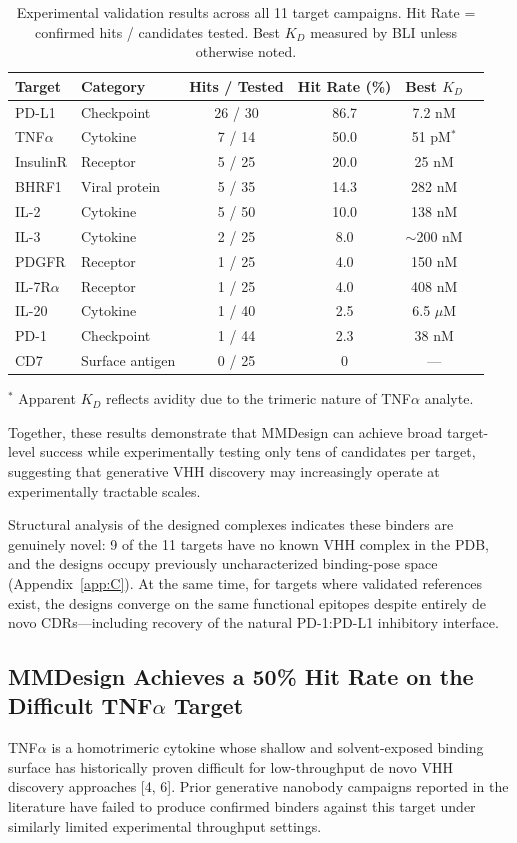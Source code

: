 \documentclass[11pt]{article}
\begin{document}
\begin{table}[!htbp]
\centering
\begin{tabular}{llcccc}
\toprule
Target & Category & Hits / Tested & Hit Rate (\%) & Best $K_D$\\
\midrule
PD-L1    & Checkpoint      & 26 / 30 & 86.7 & 7.2 nM\\
TNF$\alpha$  & Cytokine        & 7 / 14  & 50.0 & 51 pM$^{\ast}$\\
InsulinR & Receptor        & 5 / 25  & 20.0 & 25 nM\\
BHRF1    & Viral protein   & 5 / 35  & 14.3 & 282 nM\\
IL-2     & Cytokine        & 5 / 50  & 10.0 & 138 nM\\
IL-3     & Cytokine        & 2 / 25  & 8.0  & $\sim$200 nM\\
PDGFR    & Receptor        & 1 / 25  & 4.0  & 150 nM\\
IL-7R$\alpha$ & Receptor    & 1 / 25  & 4.0  & 408 nM\\
IL-20    & Cytokine        & 1 / 40  & 2.5  & 6.5 $\mu$M\\
PD-1     & Checkpoint      & 1 / 44  & 2.3  & 38 nM\\
\midrule
CD7      & Surface antigen & 0 / 25  & 0    & ---\\
\bottomrule
\end{tabular}
\caption{Experimental validation results across all 11 target campaigns. Hit Rate = confirmed
hits / candidates tested. Best $K_D$ measured by BLI unless otherwise noted.}
\footnotesize{$^{\ast}$ Apparent $K_D$ reflects avidity due to the trimeric nature of TNF$\alpha$ analyte.}
\label{tab:validation}
\end{table}

Together, these results demonstrate that MMDesign can achieve broad target-level success while
experimentally testing only tens of candidates per target, suggesting that generative VHH discovery
may increasingly operate at experimentally tractable scales.

Structural analysis of the designed complexes indicates these binders are genuinely novel: 9
of the 11 targets have no known VHH complex in the PDB, and the designs occupy previously
uncharacterized binding-pose space (Appendix~\ref{app:C}). At the same time, for targets where validated
references exist, the designs converge on the same functional epitopes despite entirely de novo
CDRs---including recovery of the natural PD-1:PD-L1 inhibitory interface.

\subsection{MMDesign Achieves a 50\% Hit Rate on the Difficult TNF$\alpha$ Target}
TNF$\alpha$ is a homotrimeric cytokine whose shallow and solvent-exposed binding surface has historically proven difficult for low-throughput de novo VHH discovery approaches [4, 6]. Prior generative
nanobody campaigns reported in the literature have failed to produce confirmed binders against
this target under similarly limited experimental throughput settings.
\end{document}
